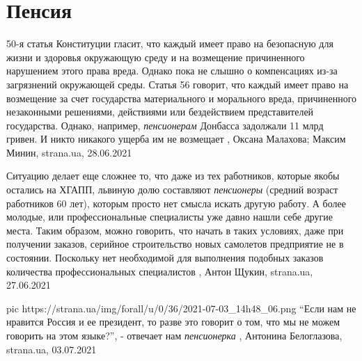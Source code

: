  
 
 
 
 
\chapter{Пенсия}
\label{sec:slova.pensia}

50-я статья Конституции гласит, что каждый имеет право на безопасную для жизни
и здоровья окружающую среду и на возмещение причиненного нарушением этого права
вреда.  Однако пока не слышно о компенсациях из-за загрязнений окружающей
среды.  Статья 56 говорит, что каждый имеет право на возмещение за счет
государства материального и морального вреда, причиненного незаконными
решениями, действиями или бездействием представителей государства.  Однако,
например, \emph{пенсионерам} Донбасса задолжали 11 млрд гривен. И никто
никакого ущерба им не возмещает
, 
Оксана Малахова; Максим Минин, strana.ua, 28.06.2021

Ситуацию делает еще сложнее то, что даже из тех работников, которые якобы
остались на ХГАПП, львиную долю составляют \emph{пенсионеры} (средний возраст
работников 60 лет), которым просто нет смысла искать другую работу. А более
молодые, или профессиональные специалисты уже давно нашли себе другие места.
Таким образом, можно говорить, что начать в таких условиях, даже при получении
заказов, серийное строительство новых самолетов предприятие не в состоянии.
Поскольку нет необходимой для выполнения подобных заказов количества
профессиональных специалистов
, Антон Щукин, strana.ua, 27.06.2021

\ifcmt
  pic https://strana.ua/img/forall/u/0/36/2021-07-03_14h48_06.png
\fi
\enquote{Если нам не нравится Россия и ее президент, то разве это говорит о том, что мы
не можем говорить на этом языке?}, - отвечает нам \emph{пенсионерка}
, 
Антонина Белоглазова, strana.ua, 03.07.2021

